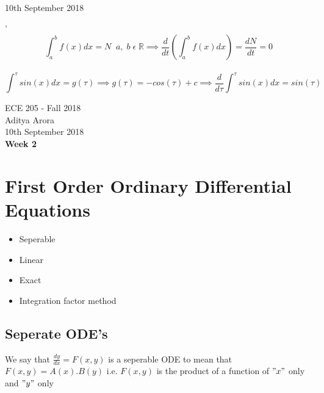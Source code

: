 \documentclass[11pt]{article}
\theoremstyle{definition}
\newcommand{\R}{\mathbb{R}}
\begin{document}
\begin{center}
    {\LARGE 10th September 2018}
\end{center}'
$$\int_a^bf(x)dx = N\;\; a,\;b\; \epsilon\; \R \implies \frac{d}{dt}(\int_a^bf(x)dx) = \frac{dN}{dt} = 0$$
\\
$$\int^\tau sin(x)dx = g(\tau) \implies g(\tau) = -cos(\tau) + c \implies \frac{d}{d\tau} \int^\tau sin(x)dx = sin(\tau)$$

\newpage
\begin{center}
{\LARGE ECE 205 - Fall 2018 \\ Aditya Arora\\ \vspace{5mm} 10th September 2018}\\
{\vspace{5mm} \LARGE \bf Week 2}

\end{center}

\section{First Order Ordinary Differential Equations}
\begin{itemize}
    \item Seperable
    \item Linear
    \item Exact
    \item Integration factor method
\end{itemize}

\subsection{Seperate ODE's}
We say that $\frac{dy}{dx} = F(x, y)$ is a seperable ODE to mean that $F(x, y) = A(x).B(y)$ i.e. $F(x,y)$ is the product of a function of $"x"$ only and $"y"$ only\\
\end{document}
